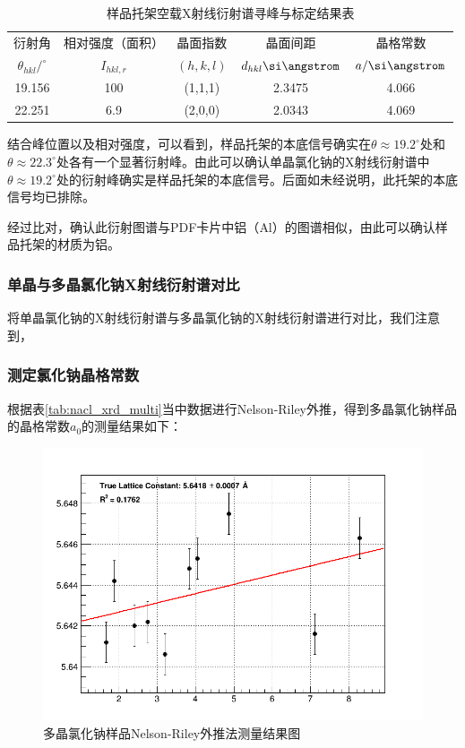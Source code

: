 \documentclass{thuemp}
\begin{document}
\begin{table}[H]
    \centering
    \captionnamefont{\wuhao\bf\heiti}
    \captiontitlefont{\wuhao\bf\heiti}
    \caption{样品托架空载X射线衍射谱寻峰与标定结果表}
    \label{tab:nacl_xrd_holder}
    \liuhao
    \begin{tabular}{ccccc}
        \toprule
        衍射角 & 相对强度（面积）& 晶面指数 & 晶面间距 & 晶格常数 \\
        $\theta_{hkl}/^\circ$ & $I_{hkl,r}$ & $(h,k,l)$ & $d_{hkl}\text{\si\angstrom}$ & $a/\text{\si\angstrom}$\\
        \midrule
        19.156 & 100 & (1,1,1) & 2.3475 & 4.066 \\
        22.251 & 6.9 & (2,0,0) & 2.0343 & 4.069 \\
        \bottomrule
    \end{tabular}
\end{table}

结合峰位置以及相对强度，可以看到，样品托架的本底信号确实在$\theta \approx 19.2^\circ$处和$\theta \approx 22.3^\circ$处各有一个显著衍射峰。由此可以确认单晶氯化钠的X射线衍射谱中$\theta \approx 19.2^\circ$处的衍射峰确实是样品托架的本底信号。后面如未经说明，此托架的本底信号均已排除。

经过比对，确认此衍射图谱与PDF卡片中铝（$\text{Al}$）的图谱相似，由此可以确认样品托架的材质为铝。

\subsubsection{单晶与多晶氯化钠X射线衍射谱对比}

将单晶氯化钠的X射线衍射谱与多晶氯化钠的X射线衍射谱进行对比，我们注意到，

\subsubsection{测定氯化钠晶格常数}

根据表\ref{tab:nacl_xrd_multi}当中数据进行Nelson-Riley外推，得到多晶氯化钠样品的晶格常数$a_0$的测量结果如下：

\begin{figure}[H]
    \centering
    \includegraphics[width=0.8\linewidth]{../Data/Fit_nacl_xrd_multi.png}
    \caption{多晶氯化钠样品Nelson-Riley外推法测量结果图}
    \label{fig:nacl_xrd_extrapol}
\end{figure}
\end{document}

